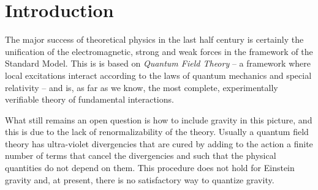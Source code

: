 \documentclass[draft]{phd}
\begin{document}
	\chapter*{Introduction}
The major success of theoretical physics in the last half century is certainly the unification of the  electromagnetic, strong and weak forces in the framework of the Standard Model.
This is is based on \emph{Quantum Field Theory} -- a framework where local excitations interact according to the laws of quantum mechanics and special relativity -- and is, 
as far as we know, the most complete, experimentally verifiable theory of fundamental interactions. 
%
	
What still remains an open question is how to include gravity in this picture, and this is due to the lack of renormalizability of  the theory.  
%		
Usually a quantum field theory  has  ultra-violet divergencies that are cured by adding to the action a finite number of terms  that cancel the divergencies and such that the physical quantities 
do not depend on them.  This procedure does not hold for Einstein gravity and, at present,  there is no 
%
satisfactory way to quantize  gravity.
\end{document}
